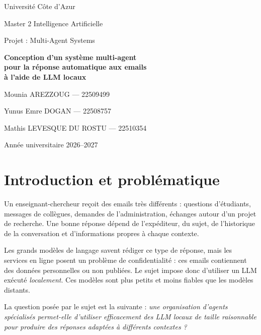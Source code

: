 \documentclass[11pt,a4paper]{article}
\begin{document}
\begin{titlepage}
  \centering
  \vspace*{2cm}
  {\large Université Côte d'Azur\par}
  {\large Master 2 Intelligence Artificielle\par}
  \vspace{2.5cm}
  {\large Projet : Multi-Agent Systems\par}
  \vspace{0.8cm}
  {\LARGE\bfseries Conception d'un système multi-agent\\[4pt]
   pour la réponse automatique aux emails\\[4pt]
   à l'aide de LLM locaux\par}
  \vspace{2.5cm}
  {\large Mounia AREZZOUG --- 22509499\par}
  \vspace{0.3cm}
  {\large Yunus Emre DOGAN --- 22508757\par}
  \vspace{0.3cm}
  {\large Mathis LEVESQUE DU ROSTU --- 22510354\par}
  \vfill
  {Année universitaire 2026--2027\par}
\end{titlepage}

\tableofcontents
\newpage

\section{Introduction et problématique}

Un enseignant-chercheur reçoit des emails très différents : questions d'étudiants,
messages de collègues, demandes de l'administration, échanges autour d'un projet de
recherche. Une bonne réponse dépend de l'expéditeur, du sujet, de l'historique de la
conversation et d'informations propres à chaque contexte.

Les grands modèles de langage savent rédiger ce type de réponse, mais les services en
ligne posent un problème de confidentialité : ces emails contiennent des données
personnelles ou non publiées. Le sujet impose donc d'utiliser un LLM exécuté
\emph{localement}. Ces modèles sont plus petits et moins fiables que les modèles distants.

La question posée par le sujet est la suivante : \emph{une organisation d'agents
spécialisés permet-elle d'utiliser efficacement des LLM locaux de taille raisonnable pour
produire des réponses adaptées à différents contextes ?}
\end{document}
